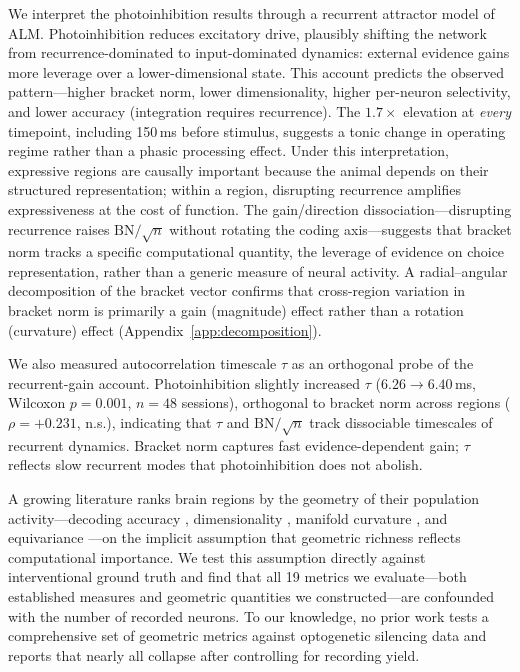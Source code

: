 \documentclass[9pt,lineno]{elife}
\begin{document}
We interpret the photoinhibition results through a recurrent attractor model of ALM. Photoinhibition reduces excitatory drive, plausibly shifting the network from recurrence-dominated to input-dominated dynamics: external evidence gains more leverage over a lower-dimensional state. This account predicts the observed pattern---higher bracket norm, lower dimensionality, higher per-neuron selectivity, and lower accuracy (integration requires recurrence). The $1.7\times$ elevation at \emph{every} timepoint, including 150\,ms before stimulus, suggests a tonic change in operating regime rather than a phasic processing effect. Under this interpretation, expressive regions are causally important because the animal depends on their structured representation; within a region, disrupting recurrence amplifies expressiveness at the cost of function. The gain/direction dissociation---disrupting recurrence raises $\text{BN}/\!\sqrt{n}$ without rotating the coding axis---suggests that bracket norm tracks a specific computational quantity, the leverage of evidence on choice representation, rather than a generic measure of neural activity. A radial--angular decomposition of the bracket vector confirms that cross-region variation in bracket norm is primarily a gain (magnitude) effect rather than a rotation (curvature) effect (Appendix~\ref{app:decomposition}).

We also measured autocorrelation timescale $\tau$ as an orthogonal probe of the recurrent-gain account. Photoinhibition slightly increased $\tau$ ($6.26 \to 6.40$\,ms, Wilcoxon $p = 0.001$, $n = 48$ sessions), orthogonal to bracket norm across regions ($\rho = +0.231$, n.s.), indicating that $\tau$ and $\text{BN}/\!\sqrt{n}$ track dissociable timescales of recurrent dynamics. Bracket norm captures fast evidence-dependent gain; $\tau$ reflects slow recurrent modes that photoinhibition does not abolish.

A growing literature ranks brain regions by the geometry of their population activity---decoding accuracy \citep{steinmetz2019distributed}, dimensionality \citep{cunningham2014dimensionality, stringer2019high}, manifold curvature \citep{gardner2022toroidal}, and equivariance \citep{ostrow2023beyond}---on the implicit assumption that geometric richness reflects computational importance. We test this assumption directly against interventional ground truth and find that all 19 metrics we evaluate---both established measures and geometric quantities we constructed---are confounded with the number of recorded neurons. To our knowledge, no prior work tests a comprehensive set of geometric metrics against optogenetic silencing data and reports that nearly all collapse after controlling for recording yield.
\end{document}
